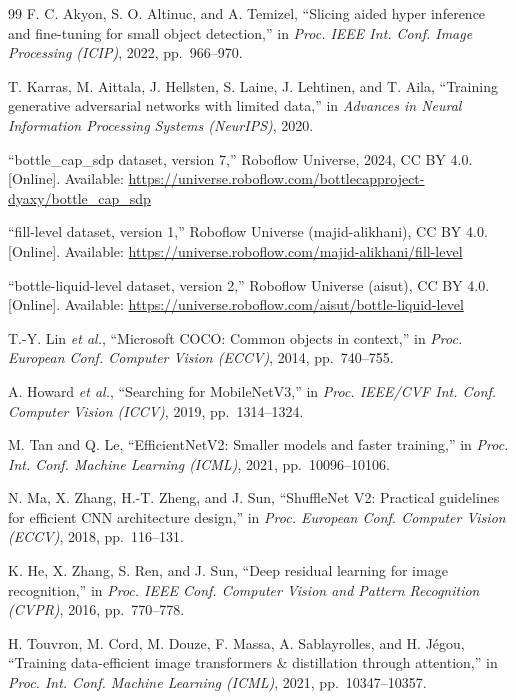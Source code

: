 \begin{thebibliography}{99}
F. C. Akyon, S. O. Altinuc, and A. Temizel,
``Slicing aided hyper inference and fine-tuning for small object detection,''
in \emph{Proc. IEEE Int. Conf. Image Processing (ICIP)}, 2022, pp.~966--970.

T. Karras, M. Aittala, J. Hellsten, S. Laine, J. Lehtinen, and T. Aila,
``Training generative adversarial networks with limited data,''
in \emph{Advances in Neural Information Processing Systems (NeurIPS)}, 2020.

``bottle\_cap\_sdp dataset, version 7,'' Roboflow Universe, 2024, CC BY 4.0. [Online]. Available: \url{https://universe.roboflow.com/bottlecapproject-dyaxy/bottle_cap_sdp}

``fill-level dataset, version 1,'' Roboflow Universe (majid-alikhani), CC BY 4.0. [Online]. Available: \url{https://universe.roboflow.com/majid-alikhani/fill-level}

``bottle-liquid-level dataset, version 2,'' Roboflow Universe (aisut), CC BY 4.0. [Online]. Available: \url{https://universe.roboflow.com/aisut/bottle-liquid-level}

T.-Y. Lin \emph{et al.},
``Microsoft COCO: Common objects in context,''
in \emph{Proc. European Conf. Computer Vision (ECCV)}, 2014, pp.~740--755.

A. Howard \emph{et al.},
``Searching for MobileNetV3,''
in \emph{Proc. IEEE/CVF Int. Conf. Computer Vision (ICCV)}, 2019, pp.~1314--1324.

M. Tan and Q. Le,
``EfficientNetV2: Smaller models and faster training,''
in \emph{Proc. Int. Conf. Machine Learning (ICML)}, 2021, pp.~10096--10106.

N. Ma, X. Zhang, H.-T. Zheng, and J. Sun,
``ShuffleNet V2: Practical guidelines for efficient CNN architecture design,''
in \emph{Proc. European Conf. Computer Vision (ECCV)}, 2018, pp.~116--131.

K. He, X. Zhang, S. Ren, and J. Sun,
``Deep residual learning for image recognition,''
in \emph{Proc. IEEE Conf. Computer Vision and Pattern Recognition (CVPR)}, 2016, pp.~770--778.

H. Touvron, M. Cord, M. Douze, F. Massa, A. Sablayrolles, and H. J\'egou,
``Training data-efficient image transformers \& distillation through attention,''
in \emph{Proc. Int. Conf. Machine Learning (ICML)}, 2021, pp.~10347--10357.

\end{thebibliography}
